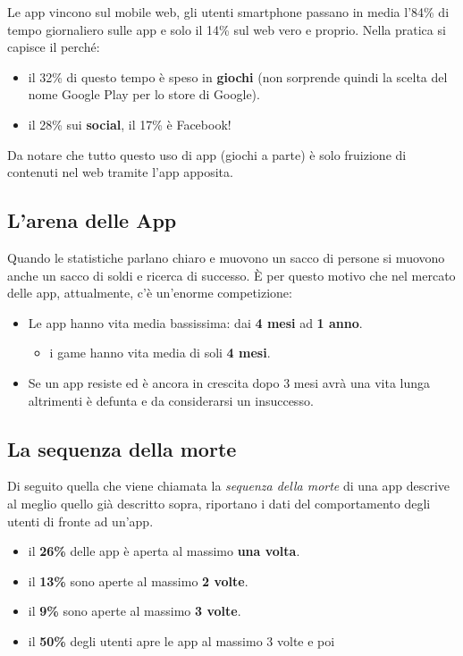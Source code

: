 			Le app vincono sul mobile web, gli utenti smartphone passano in media l'84\% di tempo giornaliero sulle app e solo il 14\% sul web vero e proprio. Nella pratica si capisce il perché:
			\begin{itemize}
				\item il 32\% di questo tempo è speso in \textbf{giochi} (non sorprende quindi la scelta del nome Google Play per lo store di Google).
				\item il 28\% sui \textbf{social}, il 17\% è Facebook!
			\end{itemize}
			Da notare che tutto questo uso di app (giochi a parte) è solo fruizione di contenuti nel web tramite l'app apposita.
			
		\subsection{L'arena delle App}
			Quando le statistiche parlano chiaro e muovono un sacco di persone si muovono anche un sacco di soldi e ricerca di successo. È per questo motivo che nel mercato delle app, attualmente, c'è un'enorme competizione:
			\begin{itemize}
				\item Le app hanno vita media bassissima: dai \textbf{4 mesi} ad \textbf{1 anno}.
					\begin{itemize}
						\item i game hanno vita media di soli \textbf{4 mesi}.
					\end{itemize}
				\item Se un app resiste ed è ancora in crescita dopo 3 mesi avrà una vita lunga altrimenti è defunta e da considerarsi un insuccesso.
			\end{itemize}
			
			\subsection{La sequenza della morte}
				Di seguito quella che viene chiamata la \emph{sequenza della morte} di una app descrive al meglio quello già descritto sopra, riportano i dati del comportamento degli utenti di fronte ad un'app.
				\begin{itemize}
					\item il \textbf{26\%} delle app è aperta al massimo \textbf{una volta}.
					\item il \textbf{13\%} sono aperte al massimo \textbf{2 volte}.
					\item il \textbf{9\%} sono aperte al massimo \textbf{3 volte}.
					\item il \textbf{50\%} degli utenti apre le app al massimo 3 volte e poi 
				\end{itemize}
		
